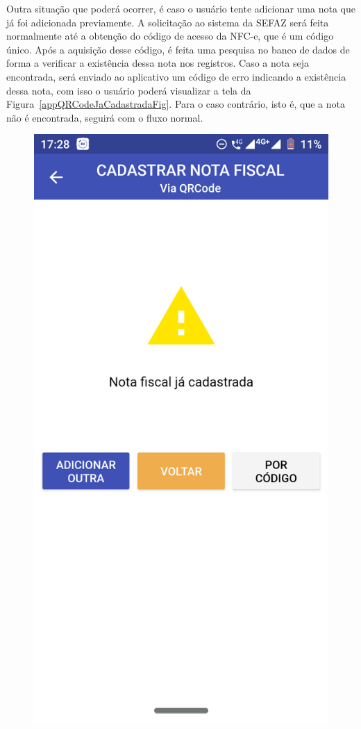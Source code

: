 \newpage
Outra situação que poderá ocorrer, é caso o usuário tente adicionar uma nota que já foi adicionada previamente. A solicitação ao sistema da SEFAZ será feita normalmente até a obtenção do código de acesso da NFC-e, que é um código único. Após a aquisição desse código, é feita uma pesquisa no banco de dados de forma a verificar a existência dessa nota nos registros. Caso a nota seja encontrada, será enviado ao aplicativo um código de erro indicando a existência dessa nota, com isso o usuário poderá visualizar a tela da Figura~\ref{appQRCodeJaCadastradaFig}. Para o caso contrário, isto é, que a nota não é encontrada, seguirá com o fluxo normal.

\begin{figure}[h]
    \centering
    \includegraphics[scale=0.15]{tcc/figures/app/app_codigo_qrcode_ja_cadastrada.png}

\end{figure}
